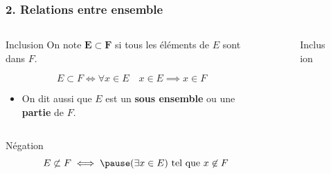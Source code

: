 \documentclass{beamer}
\begin{document}
\begin{frame}[<+->]
  \frametitle{2. Relations entre ensemble}
  \small

  \begin{columns}
    \begin{column}{0.7\textwidth}
      
 \begin{block}{Inclusion}
   On note $\mathbf{ E \subset F}$ si \alert{tous} les éléments de $E$ sont dans
   $F$.

   \begin{equation}
    E \subset F \iff \forall x\in E \quad x\in E \implies x\in F
   \end{equation}
 \end{block} 
 \begin{itemize}
   \item On dit aussi que $E$ est un \textbf{\alert{sous ensemble}} ou une
     \textbf{\alert{partie}}  de $F$.
 \end{itemize}
    \end{column}
    \begin{column}{0.3\textwidth}
     \begin{figure}[htpb]
     \begin{center}
     \end{center}
     \caption{Inclusion}%
     \label{fig:}
     \end{figure}
      
    \end{column}
  \end{columns}

  \begin{columns}
    \begin{column}{0.7\textwidth}
 \begin{block}{Négation}
  \begin{equation}
    E \not\subset F \iff \pause (\exists x \in E) \text{ tel que } x\not\in F 
  \end{equation} 
 \end{block}
    \end{column}
    \begin{column}{0.3\textwidth}
     \begin{center}
     \end{center}
      
    \end{column}
  \end{columns}
\end{frame}
\end{document}
